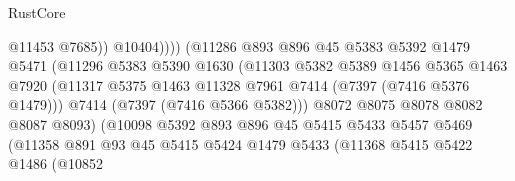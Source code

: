 \begin{lexlean}{RustCore}
\begin{coremodule}
                                            @11453
                                            @7685))
                                        @10404))))
                                (@11286
                                  @893
                                  @896
                                  @45
                                  @5383
                                  @5392
                                  @1479
                                  @5471
                                  (@11296
                                    @5383
                                    @5390
                                    @1630
                                    (@11303
                                      @5382
                                      @5389
                                      @1456
                                      @5365
                                      @1463
                                      @7920
                                      (@11317
                                        @5375
                                        @1463
                                        @11328
                                        @7961
                                        @7414
                                        (@7397 (@7416 @5376 @1479)))
                                      @7414
                                      (@7397 (@7416 @5366 @5382)))
                                    @8072
                                    @8075
                                    @8078
                                    @8082
                                    @8087
                                    @8093)
                                  (@10098
                                    @5392
                                    @893
                                    @896
                                    @45
                                    @5415
                                    @5433
                                    @5457
                                    @5469
                                    (@11358
                                      @891
                                      @93
                                      @45
                                      @5415
                                      @5424
                                      @1479
                                      @5433
                                      (@11368
                                        @5415
                                        @5422
                                        @1486
                                        (@10852

\end{coremodule}
\end{lexlean}

